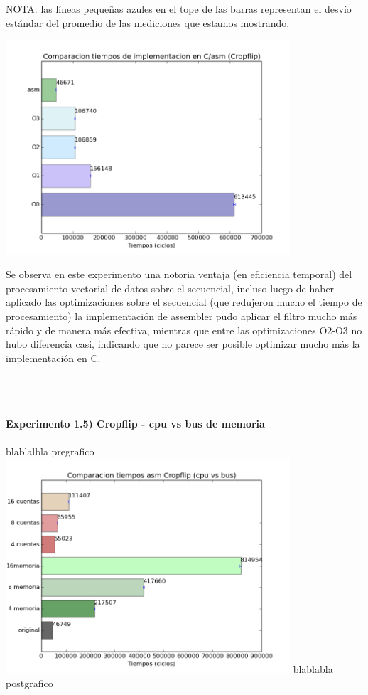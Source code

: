 \documentclass[a4paper]{article}
\begin{document}
NOTA: las l\'{i}neas peque\~nas azules en el tope de las barras representan el desv\'{i}o est\'{a}ndar del promedio de las mediciones que estamos mostrando.

\includegraphics[width=300pt]{imagenes/CompCasm1.png}

Se observa en este experimento una notoria ventaja (en eficiencia temporal) del procesamiento vectorial de datos sobre el secuencial, incluso luego de haber aplicado las optimizaciones sobre el secuencial (que redujeron mucho el tiempo de procesamiento) la implementaci\'{o}n de assembler pudo aplicar el filtro mucho m\'{a}s r\'{a}pido y de manera m\'{a}s efectiva, mientras que entre las optimizaciones O2-O3 no hubo diferencia casi, indicando que no parece ser posible optimizar mucho m\'{a}s la implementaci\'{o}n en C.\\ \\ \\ \\

\newpage

\textbf{Experimento 1.5) Cropflip - cpu vs bus de memoria}\\ \\

blablalbla pregrafico
\includegraphics[width=300pt]{imagenes/bvmcrop.png}
blablabla postgrafico \\ \\ \\ \\
\end{document}
